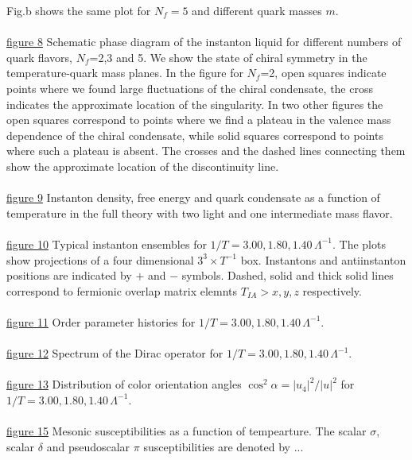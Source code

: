 Fig.b shows the same plot for $N_f=5$ and different quark masses $m$.
\\ \\
\underline{figure 8} Schematic phase diagram of the instanton liquid for
different numbers of quark flavors, $N_f$=2,3 and 5. We show the state
of chiral symmetry in the temperature-quark mass planes. In the figure
for $N_f$=2, open squares indicate points where we found large fluctuations
of the chiral condensate, the cross indicates the approximate location
of the singularity. In two other figures the open squares correspond
to points where we find a plateau in the valence mass dependence of the
chiral condensate, while solid squares correspond to points where such
a plateau is absent. The crosses and the dashed lines connecting them
show the approximate location of the discontinuity line.
\\ \\
\underline{figure 9} Instanton density, free energy and quark condensate
as a function of temperature in the full theory with two light and
one intermediate mass flavor.
\\ \\
\underline{figure 10} Typical instanton ensembles for $1/T=3.00,1.80,1.40
\,\Lambda^{-1}$. The plots show projections of a four dimensional
$3^3\times T^{-1}$ box. Instantons and antiinstanton positions are
indicated by $+$ and $-$ symbols. Dashed, solid and thick solid
lines correspond to fermionic overlap matrix elemnts $T_{IA}>x,y,z$
respectively.
\\ \\
\underline{figure 11} Order parameter histories for $1/T=3.00,1.80,1.40
\,\Lambda^{-1}$.
\\ \\
\underline{figure 12} Spectrum of the Dirac operator for $1/T=3.00,1.80,1.40
\,\Lambda^{-1}$.
\\ \\
\underline{figure 13} Distribution of color orientation angles
$\cos^2\alpha=|u_4|^2/|u|^2$ for $1/T=3.00,1.80,1.40 \,\Lambda^{-1}$.
\\ \\
\underline{figure 15} Mesonic susceptibilities as a function of tempearture.
The scalar $\sigma$, scalar $\delta$ and pseudoscalar $\pi$ susceptibilities
are denoted by ...

\newpage
\begin{figure}
\begin{center}
\leavevmode
{}
\end{center}
\caption{}
\end{figure}
\vfill

